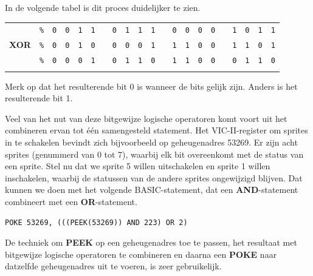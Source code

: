 In de volgende tabel is dit proces duidelijker te zien.

\begin{center}
	\begin{tabular}{ccccccccccccccccccccc}
	  & \texttt{\%} & \texttt{0} & \texttt{0} & \texttt{1} & \texttt{1} & & \texttt{0} & \texttt{1} & \texttt{1} & \texttt{1} & & \texttt{0} & \texttt{0} & \texttt{0} & \texttt{0} & & \texttt{1} & \texttt{0} & \texttt{1} & \texttt{1} \\	  {\bf XOR} & \texttt{\%} & \texttt{0} & \texttt{0} & \texttt{1} & \texttt{0} & &  \texttt{0} & \texttt{0} & \texttt{0} & \texttt{1} &  & \texttt{1} & \texttt{1} & \texttt{0} & \texttt{0} & & \texttt{1} & \texttt{1} & \texttt{0} & \texttt{1} \\ \hline	  & \texttt{\%} & \texttt{0} & \texttt{0} & \texttt{0} & \texttt{1} & & \texttt{0} & \texttt{1} & \texttt{1} & \texttt{0} & &  \texttt{1} & \texttt{1} & \texttt{0} & \texttt{0} & & \texttt{0} & \texttt{1} & \texttt{1} & \texttt{0} \\ \hhline{=====================}
	  \end{tabular}
\end{center}

Merk op dat het resulterende bit 0 is wanneer de bits gelijk zijn. Anders is het resulterende bit 1.

Veel van het nut van deze bitgewijze logische operatoren komt voort uit het combineren ervan tot één samengesteld statement. Het VIC-II-register om sprites in te schakelen bevindt zich bijvoorbeeld op geheugenadres 53269. Er zijn acht sprites (genummerd van 0 tot 7), waarbij elk bit overeenkomt met de status van een sprite. Stel nu dat we sprite 5 willen uitschakelen en sprite 1 willen inschakelen, waarbij de statussen van de andere sprites ongewijzigd blijven. Dat kunnen we doen met het volgende BASIC-statement, dat een {\bf AND}-statement combineert met een {\bf OR}-statement.

\begin{tcolorbox}[colback=black,coltext=white]
\verbatimfont{\codefont}
\begin{verbatim}
POKE 53269, (((PEEK(53269)) AND 223) OR 2)
\end{verbatim}
\end{tcolorbox}

De techniek om {\bf PEEK} op een geheugenadres toe te passen, het resultaat met bitgewijze logische operatoren te combineren en daarna een {\bf POKE} naar datzelfde geheugenadres uit te voeren, is zeer gebruikelijk.

